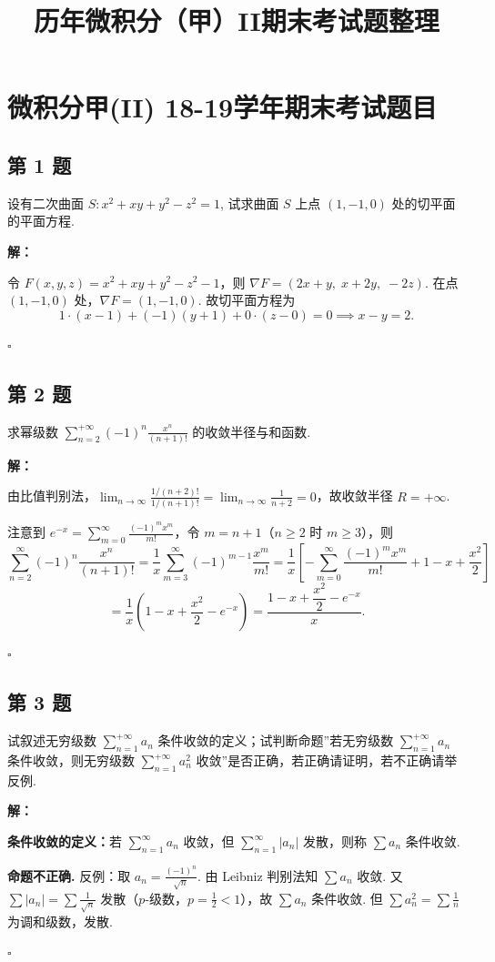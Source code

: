 \documentclass[12pt,a4paper]{article}
\newenvironment{sol}[1][解]{%
  \par\medskip\noindent\textbf{#1：}\itshape\par\noindent\ignorespaces
}{%
  \par\hfill$\square$\par\medskip
}
\begin{document}
\title{历年微积分（甲）II期末考试题整理}
\author{}
\date{}
\maketitle

\section*{微积分甲(II) 18-19学年期末考试题目}

\subsection*{第 1 题}
设有二次曲面 $S: x^2+xy+y^2-z^2=1$, 试求曲面 $S$ 上点 $(1,-1,0)$ 处的切平面的平面方程.

\begin{sol} 令 $F(x,y,z)=x^2+xy+y^2-z^2-1$，则 $\nabla F=(2x+y,\;
  x+2y,\; -2z)$.
  在点 $(1,-1,0)$ 处，$\nabla F=(1,-1,0)$. 故切平面方程为
  $$1\cdot(x-1)+(-1)(y+1)+0\cdot(z-0)=0 \implies x-y=2.$$

\end{sol}
\subsection*{第 2 题}
求幂级数 $\sum_{n=2}^{+\infty}(-1)^n \frac{x^n}{(n+1)!}$ 的收敛半径与和函数.

\begin{sol}
  由比值判别法，$\lim_{n\to\infty}\frac{1/(n+2)!}{1/(n+1)!}=\lim_{n\to\infty}\frac{1}{n+2}=0$，故收敛半径
  $R=+\infty$.

  注意到 $e^{-x}=\sum_{m=0}^{\infty}\frac{(-1)^m x^m}{m!}$，令 $m=n+1$（$n\ge
  2$ 时 $m\ge 3$），则
  $$\sum_{n=2}^{\infty}(-1)^n\frac{x^n}{(n+1)!}=\frac{1}{x}\sum_{m=3}^{\infty}(-1)^{m-1}\frac{x^m}{m!}
  =\frac{1}{x}\left[-\sum_{m=0}^{\infty}\frac{(-1)^m
  x^m}{m!}+1-x+\frac{x^2}{2}\right]$$
  $$=\frac{1}{x}\left(1-x+\frac{x^2}{2}-e^{-x}\right)=\frac{1-x+\dfrac{x^2}{2}-e^{-x}}{x}.$$

\end{sol}
\subsection*{第 3 题}
试叙述无穷级数 $\sum_{n=1}^{+\infty}a_n$ 条件收敛的定义；试判断命题”若无穷级数
$\sum_{n=1}^{+\infty}a_n$ 条件收敛，则无穷级数 $\sum_{n=1}^{+\infty}a_n^2$
收敛”是否正确，若正确请证明，若不正确请举反例.

\begin{sol}\textbf{条件收敛的定义：}若 $\sum_{n=1}^{\infty}a_n$ 收敛，但
  $\sum_{n=1}^{\infty}|a_n|$ 发散，则称 $\sum a_n$ 条件收敛.

  \textbf{命题不正确.} 反例：取 $a_n=\frac{(-1)^n}{\sqrt{n}}$. 由 Leibniz 判别法知
  $\sum a_n$ 收敛. 又 $\sum|a_n|=\sum\frac{1}{\sqrt{n}}$
  发散（$p$-级数，$p=\frac{1}{2}<1$），故 $\sum a_n$ 条件收敛. 但 $\sum
  a_n^2=\sum\frac{1}{n}$ 为调和级数，发散.

\end{sol}
\end{document}
